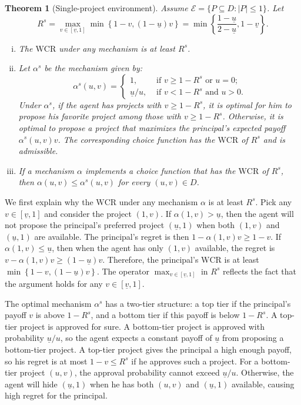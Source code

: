 \documentclass[12pt,english]{article}
\newcommand{\cale}{\mathcal E}
\newcommand{\underv}{\underline{v}}
\newcommand{\under}{\underline}
\newcommand{\underu}{{\underline{u}}}
\theoremstyle{remark}
\theoremstyle{plain}
\newtheorem{theorem}{Theorem}[section]
\theoremstyle{definition}
\newcommand{\wcr}{\mathrm{WCR}}
\begin{document}
 \begin{theorem}[Single-project environment]\label{th:one-project}
Assume $\cale=\{P\subseteq D: |P|\leqslant 1 \}$. Let
   \begin{equation}\label{r-one} R^s =\max_{v\in [\under v,1]}\min\left\{1-v, (1-\underu)v\right\}=\min\left\{\frac{1-\underu}{2-\underu}, 1 - \under v\right\}.
\end{equation}
\begin{enumerate}[(i)]
\vspace{-0.35cm} \item The $\wcr$ under any mechanism is at least $R^s$. 
\vspace{-0.35cm} \item Let $\alpha^s$ be the mechanism given by:
      \[\alpha^s(u,v)=\begin{cases}1, &\text{ if }v\geqslant 1-R^s \text{ or } u=0;\\ { \under u}/{u}, &\text{ if }v<1-R^s \text{ and }u>0. \end{cases}\]
Under $\alpha^s$, if the agent has projects with $v\geqslant 1-R^s$, it is optimal for him to propose his favorite project among those with $v\geqslant 1-R^s$. Otherwise, it is optimal to propose a project that maximizes the principal's expected payoff $\alpha^s(u,v)v$. The corresponding choice function has the $\wcr$ of $R^s$ and is admissible. 
\vspace{-0.35cm} \item \label{singlethree} If a mechanism $\alpha$ implements a choice function that has the $\wcr$ of $R^s$, then $\alpha(u,v)\leqslant \alpha^s(u,v)$ for every $(u,v)\in D$. 
\end{enumerate}
\end{theorem}
We first explain why the $\wcr$ under any mechanism $\alpha$ is at least $R^s$. Pick any $v\in [\underv,1]$ and consider the project $(1,v)$. If $\alpha(1,v)> \underu$, then the agent will not propose the principal's preferred project $(\underu,1)$ when both $(1,v)$ and $(\underu,1)$ are available. The principal's regret is then $1-\alpha(1,v) v \geqslant 1-v$. If $\alpha(1,v)\leqslant \underu$, then when the agent has only $(1,v)$ available, the regret is $v-\alpha(1,v)v \geqslant  (1-\underu)v$. Therefore, the principal's $\wcr$ is at least $\min\left\{1-v, (1-\underu)v\right\}$. The operator $\max_{v \in [\underv,1]}$ in $R^s$ reflects the fact that the argument holds for any $v\in [\underv,1]$. 


The optimal mechanism $\alpha^s$ has a two-tier structure: a top tier if the principal's payoff $v$ is above $1-R^s$, and a bottom tier if this payoff is below $1-R^s$. A top-tier project is approved for sure. A bottom-tier project is approved with probability $\underu/u$, so the agent expects a constant payoff of $\underu$ from proposing a bottom-tier project. A top-tier project gives the principal a high enough payoff, so his regret is at most $1-v \leqslant R^s$ if he approves such a project. For a bottom-tier project $(u,v)$, the approval probability cannot exceed $\underu/u$. Otherwise, the agent will hide $(\underu,1)$ when he has both $(u,v)$ and $(\underu,1)$ available, causing high regret for the principal. 
\end{document}

